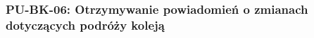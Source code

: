 \documentclass[a4paper,12pt]{article}
\begin{document}
\subsubsection{PU-BK-06: Otrzymywanie powiadomień o zmianach dotyczących podróży koleją}

\begingroup %
\small %
\renewcommand{\arraystretch}{1.2} %

\newlength{\pierwszakolumnaszerokoscPUBKPowiadomienia}
\setlength{\pierwszakolumnaszerokoscPUBKPowiadomienia}{4.0cm}

\newlength{\drugakolumnaszerokoscPUBKPowiadomienia}
\setlength{\drugakolumnaszerokoscPUBKPowiadomienia}{\dimexpr\textwidth-\pierwszakolumnaszerokoscPUBKPowiadomienia-2\tabcolsep-3\arrayrulewidth\relax}
\end{document}
